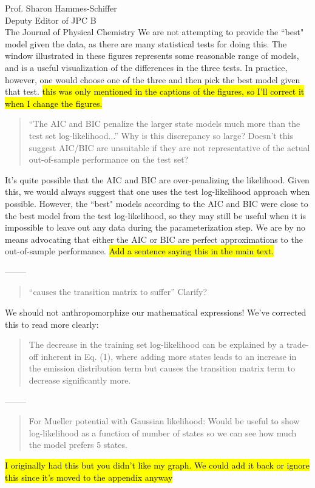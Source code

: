 \documentclass{letter}
\newcommand{\separate}{\begin{center}--------\end{center}}
\begin{document}
\begin{letter}{Prof. Sharon Hammes-Schiffer \\ Deputy Editor of JPC B \\ The Journal of Physical Chemistry}
We are not attempting to provide the ``best" model given the data, as there are many statistical tests for doing this. The window illustrated in these figures represents some reasonable range of models, and is a useful visualization of the differences in the three tests. In practice, however, one would choose one of the three and then pick the best model given that test. \hl{this was only mentioned in the captions of the figures, so I'll correct it when I change the figures.}

\begin{quote}
``The AIC and BIC penalize the larger state models much more than the test set log-likelihood...''  Why is this discrepancy so large?  Doesn't this suggest AIC/BIC are unsuitable if they are not representative of the actual out-of-sample performance on the test set?
\end{quote}

It's quite possible that the AIC and BIC are over-penalizing the likelihood. Given this, we would always suggest that one uses the test log-likelihood approach when possible. However, the ``best" models according to the AIC and BIC were close to the best model from the test log-likelihood, so they may still be useful when it is impossible to leave out any data during the parameterization step. We are by no means advocating that either the AIC or BIC are perfect approximations to the out-of-sample performance. \hl{Add a sentence saying this in the main text.}

\separate
\begin{quote}
``causes the transition matrix to suffer''  Clarify?
\end{quote}

We should not anthropomorphize our mathematical expressions! We've corrected this to read more clearly:
\begin{quote}
The decrease in the training set log-likelihood can be explained by a trade-off inherent in Eq. (1), where adding more states leads to an increase in the emission distribution term but causes the transition matrix term to decrease significantly more.
\end{quote}

\separate
\begin{quote}
For Mueller potential with Gaussian likelihood: Would be useful to show log-likelihood as a function of number of states so we can see how much the model prefers 5 states.
\end{quote}
\hl{I originally had this but you didn't like my graph. We could add it back or ignore this since it's moved to the appendix anyway}


\end{letter}
\end{document}
